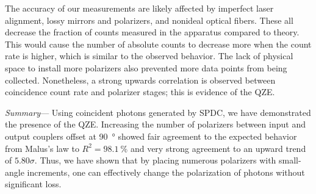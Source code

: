 \documentclass[%
reprint,
superscriptaddress,
nofootinbib,
nobibnotes,
nobalancelastpage,
amsmath,amssymb,
aps, 
prl,
floatfix,
]{revtex4-2}
\renewcommand{\section}[1]{\textit{#1}---\ignorespaces}
\begin{document}
The accuracy of our measurements are likely affected by imperfect laser alignment, lossy mirrors and polarizers, and nonideal optical fibers. These all decrease the fraction of counts measured in the apparatus compared to theory. This would cause the number of absolute counts to decrease more when the count rate is higher, which is similar to the observed behavior. The lack of physical space to install more polarizers also prevented more data points from being collected. Nonetheless, a strong upwards correlation is observed between coincidence count rate and polarizer stages; this is evidence of the QZE.

\section{Summary}
Using coincident photons generated by SPDC, we have demonstrated the presence of the QZE. Increasing the number of polarizers between input and output couplers offset at \qty{90}{\degree} showed fair agreement to the expected behavior from Malus's law to $R^2=\qty{98.1}{\percent}$ and very strong agreement to an upward trend of $\qty{5.80}\sigma$. Thus, we have shown that by placing numerous polarizers with small-angle increments, one can effectively change the polarization of photons without significant loss.


\end{document}
